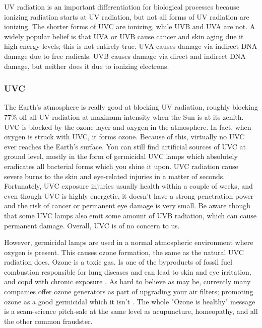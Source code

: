 UV radiation is an important differentiation for biological processes because ionizing radiation starts at UV radiation, but not all forms of UV radiation are ionizing. The shorter forms of UVC are ionizing, while UVB and UVA are not. A widely popular belief is that UVA or UVB cause cancer and skin aging due it high energy levels; this is not entirely true. UVA causes damage via indirect DNA damage due to free radicals. UVB causes damage via direct and indirect DNA damage, but neither does it due to ionizing electrons.\vspace{3 mm}

\subsubsection{UVC}

The Earth's atmosphere is really good at blocking UV radiation, roughly blocking 77\% off all UV radiation at maximum intensity when the Sun is at its zenith. UVC is blocked by the ozone layer and oxygen in the atmosphere. In fact, when oxygen is struck with UVC, it forms ozone. Because of this, virtually no UVC ever reaches the Earth's surface. You can still find artificial sources of UVC at ground level, mostly in the form of germicidal UVC lamps which absolutely eradicates all bacterial forms which you shine it upon. UVC radiation cause severe burns to the skin and eye-related injuries in a matter of seconds. Fortunately, UVC exposure injuries usually health within a couple of weeks, and even though UVC is highly energetic, it doesn't have a strong penetration power and the risk of cancer or permanent eye damage is very small. Be aware though that some UVC lamps also emit some amount of UVB radiation, which can cause permanent damage. Overall, UVC is of no concern to us.\vspace{3 mm}

However, germicidal lamps are used in a normal atmospheric environment where oxygen is present. This causes ozone formation, the same as the natural UVC radiation does. Ozone is a toxic gas. Is one of the byproducts of fossil fuel combustion responsible for lung diseases \cite{ref:Stewart2017-sk, ref:badozone2, ref:Jule2018-it} and can lead to skin and eye irritation, and \gls{copd} with chronic exposure \cite{ref:Burnett1997-ra}. As hard to believe as may be, currently many companies offer ozone generators as part of upgrading your air filters; promoting ozone as a good germicidal which it isn't \cite{ref:badozone}. The whole "Ozone is healthy" message is a scam-science pitch-sale at the same level as acupuncture, homeopathy, and all the other common fraudster.

